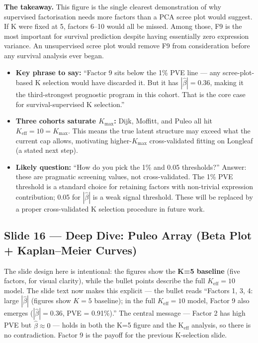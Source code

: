 \documentclass[11pt]{article}
\newcommand{\sectionlabel}[1]{\textbf{#1}}
\begin{document}
\textbf{The takeaway.} This figure is the single clearest demonstration of why supervised factorisation needs more factors than a PCA scree plot would suggest. If K were fixed at 5, factors 6--10 would all be missed. Among those, F9 is the most important for survival prediction despite having essentially zero expression variance. An unsupervised scree plot would remove F9 from consideration before any survival analysis ever began.

\begin{itemize}
  \item \sectionlabel{Key phrase to say:} ``Factor 9 sits below the 1\% PVE line --- any scree-plot-based K selection would have discarded it. But it has $|\hat{\beta}| = 0.36$, making it the third-strongest prognostic program in this cohort. That is the core case for survival-supervised K selection.''
  \item \sectionlabel{Three cohorts saturate $K_\text{max}$:} Dijk, Moffitt, and Puleo all hit $K_\text{eff} = 10 = K_\text{max}$. This means the true latent structure may exceed what the current cap allows, motivating higher-$K_\text{max}$ cross-validated fitting on Longleaf (a stated next step).
  \item \sectionlabel{Likely question:} ``How do you pick the 1\% and 0.05 thresholds?'' Answer: these are pragmatic screening values, not cross-validated. The 1\% PVE threshold is a standard choice for retaining factors with non-trivial expression contribution; 0.05 for $|\hat{\beta}|$ is a weak signal threshold. These will be replaced by a proper cross-validated K selection procedure in future work.
\end{itemize}

\subsection*{Slide 16 --- Deep Dive: Puleo Array (Beta Plot + Kaplan--Meier Curves)}

\noindent The slide design here is intentional: the figures show the \textbf{K=5 baseline} (five factors, for visual clarity), while the bullet points describe the full $K_\text{eff} = 10$ model. The slide text now makes this explicit --- the bullet reads ``Factors 1, 3, 4: large $|\hat{\beta}|$ (figures show $K = 5$ baseline); in the full $K_\text{eff} = 10$ model, Factor 9 also emerges ($|\hat{\beta}| = 0.36$, PVE = 0.91\%).'' The central message --- Factor 2 has high PVE but $\hat{\beta} \approx 0$ --- holds in both the K=5 figure and the K$_\text{eff}$ analysis, so there is no contradiction. Factor 9 is the payoff for the previous K-selection slide.
\end{document}
